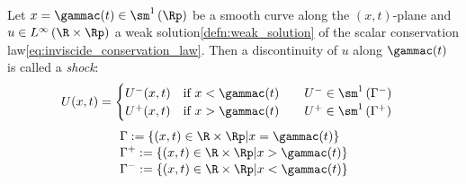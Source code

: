   \begin{defnbox}\nospacing
      \begin{defn}\label{defn:shock_waves}\leavevmode\\
          Let $x=\gammac(t)\in\sm^{1}\left(\Rp\right)$ be a smooth curve along the $(x,t)$-plane and
          $u\in L^{\infty}\left(\R\times\Rp\right)$ a weak solution\cref{defn:weak_solution} of the
          scalar conservation law\cref{eq:inviscide_conservation_law}.
          Then a discontinuity of $u$ along $\gammac(t)$ is called a \textit{shock}:
          \begin{align}
            &U(x,t)=
            \begin{cases}
                U^{-}(x,t)&\text{if }x<\gammac(t)\qquad U^{-}\in\sm^1\left(\Gamma^{-}\right)\\
                U^{+}(x,t)&\text{if }x>\gammac(t)\qquad U^{+}\in\sm^1\left(\Gamma^{+}\right)
            \end{cases}\nonumber
          \end{align}
        \begin{align}
                        &\Gamma:=\left\{(x,t)\in\R\times\Rp|x=\gammac(t)\right\}\nonumber\\[-1\jot]
                        &\Gamma^{+}:=\left\{(x,t)\in\R\times\Rp|x>\gammac(t)\right\}\label{eq:shock_wave}\\[-1\jot]
                        &\Gamma^{-}:=\left\{(x,t)\in\R\times\Rp|x<\gammac(t)\right\}\nonumber
        \end{align}
      \end{defn}
  \end{defnbox}

